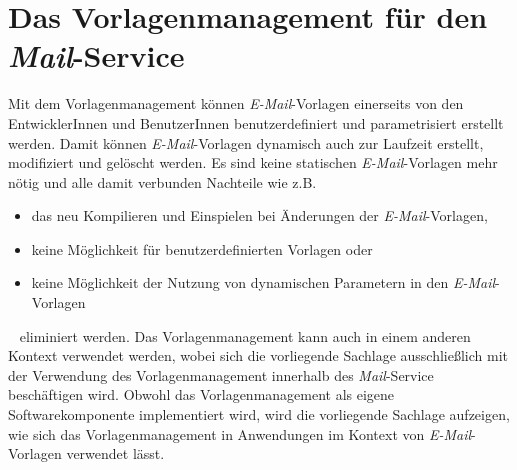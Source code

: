 \section{Das Vorlagenmanagement für den \emph{Mail}-Service}
Mit dem Vorlagenmanagement können \emph{E-Mail}-Vorlagen einerseits von den EntwicklerInnen und BenutzerInnen benutzerdefiniert und parametrisiert erstellt werden. Damit können \emph{E-Mail}-Vorlagen dynamisch auch zur Laufzeit erstellt, modifiziert und gelöscht werden. Es sind keine statischen \emph{E-Mail}-Vorlagen mehr nötig und alle damit verbunden Nachteile wie z.B. 
\begin{itemize}
	\item das neu Kompilieren und Einspielen bei Änderungen der \emph{E-Mail}-Vorlagen,
	\item keine Möglichkeit für benutzerdefinierten Vorlagen oder
	\item keine Möglichkeit der Nutzung von dynamischen Parametern in den \emph{E-Mail}-Vorlagen
\end{itemize}
\ \newline
eliminiert werden. Das Vorlagenmanagement kann auch in einem anderen Kontext verwendet werden, wobei sich die vorliegende Sachlage ausschließlich mit der Verwendung des Vorlagenmanagement innerhalb des \emph{Mail}-Service beschäftigen wird. Obwohl das Vorlagenmanagement als eigene Softwarekomponente implementiert wird, wird die vorliegende Sachlage aufzeigen, wie sich das Vorlagenmanagement in Anwendungen im Kontext von \emph{E-Mail}-Vorlagen verwendet lässt. 
\newpage

